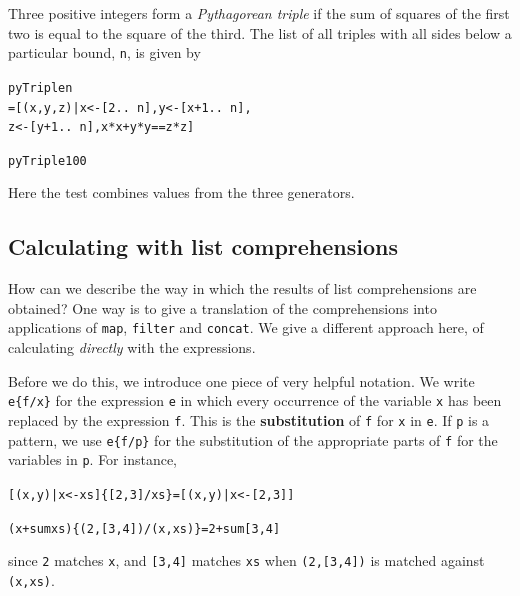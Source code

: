 Three positive integers form a \emph{Pythagorean 
triple} if the sum of squares of the first 
two is equal to the square of the third. The list of all triples with all sides
below a
particular bound, \texttt{n}, is given by
\begin{alltt}
pyTriple n
  = [ (x,y,z) | x <- [2 ..\ n] , y <- [x+1 ..\ n] , 
                z <- [y+1 ..\ n] , x*x + y*y == z*z ]

pyTriple 100 
\step [(3,4,5),(5,12,13),(6,8,10),...,(65,72,97)]         
\end{alltt}
Here the test combines values from the three generators.



\subsection*{Calculating with list comprehensions}

How can we describe the way in which the results of list comprehensions are
obtained? One way is to give a translation of the comprehensions into
applications of \texttt{map}, \texttt{filter} and \texttt{concat}.
We give a different approach here, of calculating {\em directly\/} with the
expressions. 

Before we do this, we introduce one piece of very helpful notation. We write
\texttt{e\{f/x\}} 
for the expression \texttt{e} in which every occurrence of the
variable \texttt{x} has been replaced by the expression \texttt{f}. This is the
\textbf{substitution} of \texttt{f} for \texttt{x} in \texttt{e}. If \texttt{p} is a
pattern, we use  \texttt{e\{f/p\}} for the substitution of the appropriate parts
of \texttt{f} for the variables in \texttt{p}. For instance,
\begin{alltt}
[ (x,y) | x<-xs ]\{[2,3]/xs\}    = [ (x,y) | x<-[2,3] ]

(x + sum xs)\{(2,[3,4])/(x,xs)\} = 2 + sum [3,4]
\end{alltt} 
since \texttt{2} matches \texttt{x}, and \texttt{[3,4]} matches \texttt{xs} when 
\texttt{(2,[3,4])} is matched against \texttt{(x,xs)}.

